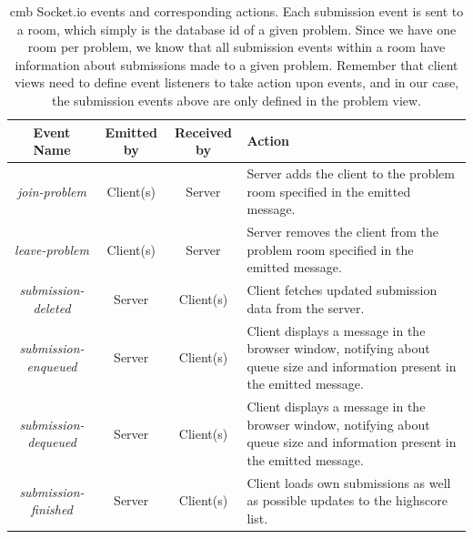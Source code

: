 \begin{table}[t!]
    \centering
    \begin{tabular}{ | c | c | c | p{3.5cm} | }
    \hline
    \textbf{Event Name} & \textbf{Emitted by} & \textbf{Received by} & \textbf{Action}\\
    \hline
    \textit{join-problem} & Client(s) & Server & Server adds the client to the problem room specified in the emitted message. \\ \hline
    \textit{leave-problem} & Client(s) & Server & Server removes the client from the problem room specified in the emitted message. \\ \hline
    \textit{submission-deleted} & Server & Client(s) & Client fetches updated submission data from the server. \\ \hline
    \textit{submission-enqueued} & Server & Client(s) & Client displays a message in the browser window, notifying about queue size and information present in the emitted message. \\ \hline
    \textit{submission-dequeued} & Server & Client(s) & Client displays a message in the browser window, notifying about queue size and information present in the emitted message. \\ \hline
    \textit{submission-finished} & Server & Client(s) & Client loads own submissions as well as possible updates to the highscore list. \\ \hline
    \end{tabular}
    \caption[Climbing Mont Blanc Socket.io events and corresponding actions]{\gls{cmb} Socket.io events and corresponding actions. Each submission event is sent to a room, which simply is the database id of a given problem. Since we have one room per problem, we know that all submission events within a room have information about submissions made to a given problem. Remember that client views need to define event listeners to take action upon events, and in our case, the submission events above are only defined in the problem view.}
    \label{tab:cmb-socketio-events}
\end{table}

